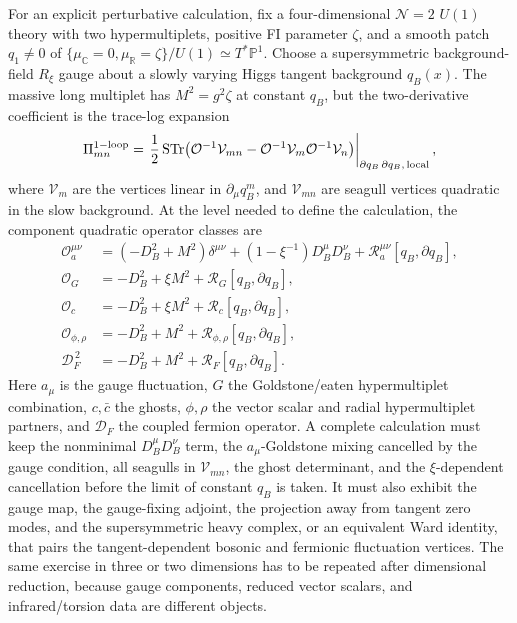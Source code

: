 \begin{construction}
\label{constr:higgs-branch-background-field-derivation-target}
For an explicit perturbative calculation, fix a four-dimensional
\(\mathcal N=2\) \(U(1)\) theory with two hypermultiplets, positive FI
parameter \(\zeta\), and a smooth patch \(q_1\ne0\) of
\(\{\mu_{\mathbb C}=0,\mu_{\mathbb R}=\zeta\}/U(1)\simeq T^\ast\mathbb P^1\).
Choose a supersymmetric background-field \(R_\xi\) gauge about a slowly varying
Higgs tangent background \(q_B(x)\).  The massive long multiplet has
\(M^2=g^2\zeta\) at constant \(q_B\), but the two-derivative coefficient is
the trace-log expansion
\begin{equation}
  \Pi_{mn}^{\rm 1-loop}
  =
  \left.
  \frac12\,{\rm STr}\!
  \left(
    {\mathcal O}^{-1}{\mathcal V}_{mn}
    -
    {\mathcal O}^{-1}{\mathcal V}_{m}
    {\mathcal O}^{-1}{\mathcal V}_{n}
  \right)
  \right|_{\partial q_B\,\partial q_B,\,{\rm local}},
  \label{eq:higgs-branch-background-field-trace-log}
\end{equation}
where \({\mathcal V}_{m}\) are the vertices linear in
\(\partial_\mu q_B^m\), and \({\mathcal V}_{mn}\) are seagull vertices
quadratic in the slow background.  At the level needed to define the
calculation, the component quadratic operator classes are
\[
\begin{aligned}
  {\mathcal O}_{a}^{\mu\nu}
  &=
  (-D_B^2+M^2)\delta^{\mu\nu}
  +(1-\xi^{-1})D_B^\mu D_B^\nu
  +{\mathcal R}_{a}^{\mu\nu}[q_B,\partial q_B],\\
  {\mathcal O}_{G}
  &=
  -D_B^2+\xi M^2+{\mathcal R}_{G}[q_B,\partial q_B],\\
  {\mathcal O}_{c}
  &=
  -D_B^2+\xi M^2+{\mathcal R}_{c}[q_B,\partial q_B],\\
  {\mathcal O}_{\phi,\rho}
  &=
  -D_B^2+M^2+{\mathcal R}_{\phi,\rho}[q_B,\partial q_B],\\
  {\mathcal D}_{F}^{\,2}
  &=
  -D_B^2+M^2+{\mathcal R}_{F}[q_B,\partial q_B].
\end{aligned}
\]
Here \(a_\mu\) is the gauge fluctuation, \(G\) the Goldstone/eaten
hypermultiplet combination, \(c,\bar c\) the ghosts, \(\phi,\rho\) the vector
scalar and radial hypermultiplet partners, and \({\mathcal D}_F\) the coupled
fermion operator.  A complete calculation must keep the nonminimal
\(D_B^\mu D_B^\nu\) term, the \(a_\mu\)-Goldstone mixing cancelled by the gauge
condition, all seagulls in \({\mathcal V}_{mn}\), the ghost determinant, and
the \(\xi\)-dependent cancellation before the limit of constant \(q_B\) is
taken.  It must also exhibit the gauge map, the gauge-fixing adjoint, the
projection away from tangent zero modes, and the supersymmetric heavy complex,
or an equivalent Ward identity, that pairs the tangent-dependent bosonic and
fermionic fluctuation vertices.  The same exercise in three or two dimensions
has to be repeated after dimensional reduction, because gauge components,
reduced vector scalars, and infrared/torsion data are different objects.
\end{construction}

